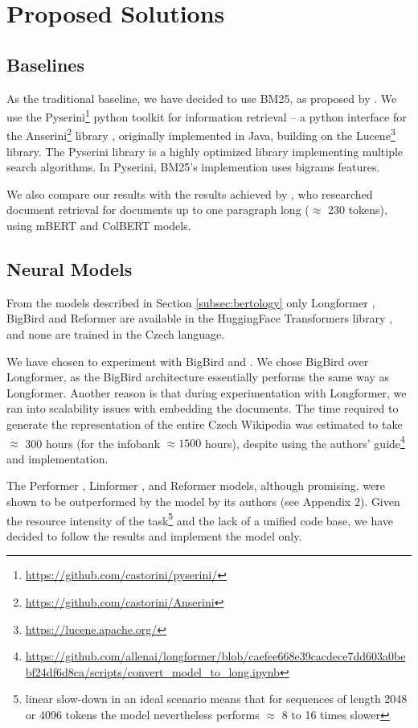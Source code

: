 \chapter{Proposed Solutions}

\section{Baselines}

As the traditional baseline, we have decided to use BM25, as proposed by \citet{weak-baselines}.
We use the Pyserini\footnote{\url{https://github.com/castorini/pyserini/}} python toolkit for information retrieval \citep{pyserini} -- a python interface for the Anserini\footnote{\url{https://github.com/castorini/Anserini}} library \citep{anserini1, anserini2}, originally implemented in Java, building on the Lucene\footnote{\url{https://lucene.apache.org/}} library.
The Pyserini library is a highly optimized library implementing multiple search algorithms. In Pyserini, BM25's implemention uses bigrams features. 

We also compare our results with the results achieved by \citet{rypar}, who researched document retrieval for documents up to one paragraph long ($\approx$ 230 tokens), using mBERT and ColBERT \citep{colbert} models.

\section{Neural Models}

From the models described in Section \ref{subsec:bertology} only Longformer \citep{longformer}, BigBird \citep{bigbird} and Reformer \citep{reformer} are available in the HuggingFace Transformers library \citep{huggingface}, and none are trained in the Czech language. 

We have chosen to experiment with BigBird and \nystr{}. 
We chose BigBird over Longformer, as the BigBird architecture essentially performs the same way as Longformer. Another reason is that during experimentation with Longformer, we ran into scalability issues with embedding the documents.
The time required to generate the representation of the entire Czech Wikipedia was estimated to take $\approx$ 300 hours (for the \CTK{} infobank $\approx 1500$ hours), despite using the authors' guide\footnote{\url{https://github.com/allenai/longformer/blob/caefee668e39cacdece7dd603a0bebf24df6d8ca/scripts/convert_model_to_long.ipynb}} and implementation.

The Performer \citep{performer}, Linformer \citep{linformer}, and Reformer \citep{reformer} models, although promising, were shown to be outperformed by the \nystr{} model by its authors (see Appendix 2).
Given the resource intensity of the task\footnote{linear slow-down in an ideal scenario means that for sequences of length 2048 or 4096 tokens the model nevertheless performs $\approx$ 8 to 16 times slower} and the lack of a unified code base, we have decided to follow the results and implement the \nystr{} model only.

